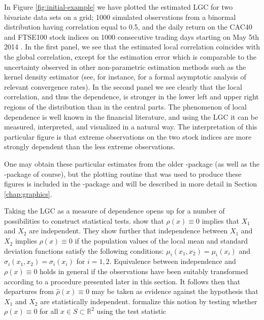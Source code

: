 In Figure \ref{fig:initial-example} we have plotted the estimated LGC for two bivariate data sets on a grid; 1000 simulated observations from a binormal distribution having correlation equal to 0.5, and the daily return on the CAC40 and FTSE100 stock indices on 1000 consecutive trading days starting on May 5th 2014 \citep{datastream}. In the first panel, we see that the estimated local correlation coincides with the global correlation, except for the estimation error which is comparable to the uncertainty observed in other non-parametric estimation methods such as the kernel density estimator (see, for instance, \citet{otne:tjos:2017} for a formal asymptotic analysis of relevant convergence rates). In the second panel we see clearly that the local correlation, and thus the dependence, is stronger in the lower left and upper right regions of the distribution than in the central parts. The phenomenon of local dependence is well known in the financial literature, and using the LGC it can be measured, interpreted, and visualized in a natural way. The interpretation of this particular figure is that extreme observations on the two stock indices are more strongly dependent than the less extreme observations. 

One may obtain these particular estimates from the older -package (as well as the -package of course), but the plotting routine that was used to produce these figures is included in the -package and will be described in more detail in Section \ref{chap:graphics}.

Taking the LGC as a measure of dependence opens up for a number of possibilities to construct statistical tests. \citet{bere:tjos:2014} show that $\rho(x) \equiv 0$ implies that $X_1$ and $X_2$ are independent. They show further that independence between $X_1$ and $X_2$ implies $\rho(x) \equiv 0$ if the population values of the local mean and standard deviation functions satisfy the following conditions: $\mu_i(x_1, x_2) = \mu_i(x_i)$ and $\sigma_i(x_1, x_2) = \sigma_i(x_i)$ for $i=1,2$. Equivalence between independence and $\rho(x) \equiv 0$ holds in general if the observations have been suitably transformed according to a procedure presented later in this section. It follows then that departures from $\widehat\rho(x) \equiv 0$ may be taken as evidence against the hypothesis that $X_1$ and $X_2$ are statistically independent. \citet{bere:tjos:2014} formalize this notion by testing whether $\rho(x) \equiv 0$ for all $x\in S \subset \mathbb{R}^2$ using the test statistic

